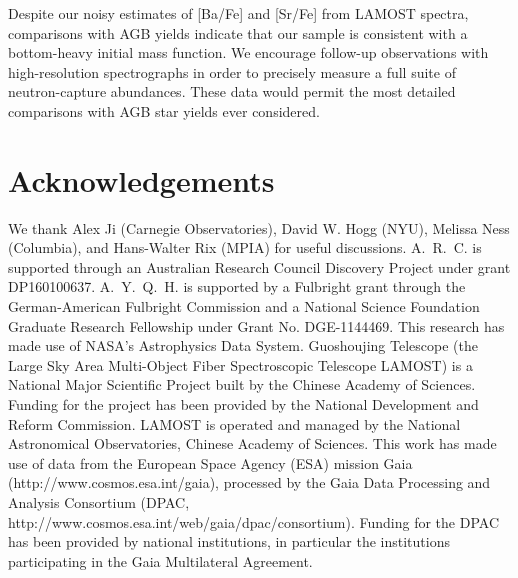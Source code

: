 \documentclass[a4paper,fleqn,usenatbib]{mnras}
\begin{document}
Despite our noisy estimates of [Ba/Fe] and [Sr/Fe] from LAMOST spectra, comparisons with AGB yields indicate that our sample is consistent with a bottom-heavy initial mass function. We encourage follow-up observations with high-resolution spectrographs in order to precisely measure a full suite of neutron-capture abundances. These data would permit the most detailed comparisons with AGB star yields ever considered.

 

\section*{Acknowledgements}
We thank Alex Ji (Carnegie Observatories), David W. Hogg (NYU), Melissa Ness (Columbia), and Hans-Walter Rix (MPIA) for useful discussions. 
A.~R.~C. is supported through an Australian Research Council Discovery Project under grant DP160100637.
A.~Y.~Q.~H. is supported by a Fulbright grant through the German-American Fulbright Commission and a National Science Foundation Graduate Research Fellowship under Grant No. DGE-1144469. 
This research has made use of NASA's Astrophysics Data System.
Guoshoujing Telescope (the Large Sky Area Multi-Object Fiber Spectroscopic Telescope LAMOST) is a National Major Scientific Project built by the Chinese Academy of Sciences. Funding for the project has been provided by the National Development and Reform Commission. LAMOST is operated and managed by the National Astronomical Observatories, Chinese Academy of Sciences. 
This work has made use of data from the European Space Agency (ESA) mission Gaia (http://www.cosmos.esa.int/gaia), processed by the Gaia Data Processing and Analysis Consortium (DPAC, http://www.cosmos.esa.int/web/gaia/dpac/consortium). Funding for the DPAC has been provided by national institutions, in particular the institutions participating in the Gaia Multilateral Agreement.


 

\end{document}
